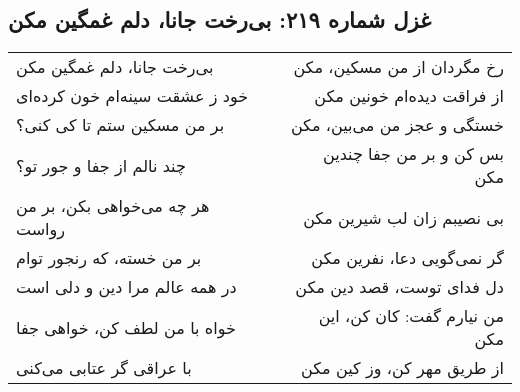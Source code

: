 \begin{center}
\section*{غزل شماره ۲۱۹: بی‌رخت جانا، دلم غمگین مکن}
\label{sec:219}
\begin{longtable}{l p{0.5cm} r}
بی‌رخت جانا، دلم غمگین مکن
&&
رخ مگردان از من مسکین، مکن
\\
خود ز عشقت سینه‌ام خون کرده‌ای
&&
از فراقت دیده‌ام خونین مکن
\\
بر من مسکین ستم تا کی کنی؟
&&
خستگی و عجز من می‌بین، مکن
\\
چند نالم از جفا و جور تو؟
&&
بس کن و بر من جفا چندین مکن
\\
هر چه می‌خواهی بکن، بر من رواست
&&
بی نصیبم زان لب شیرین مکن
\\
بر من خسته، که رنجور توام
&&
گر نمی‌گویی دعا، نفرین مکن
\\
در همه عالم مرا دین و دلی است
&&
دل فدای توست، قصد دین مکن
\\
خواه با من لطف کن، خواهی جفا
&&
من نیارم گفت: کان کن، این مکن
\\
با عراقی گر عتابی می‌کنی
&&
از طریق مهر کن، وز کین مکن
\\
\end{longtable}
\end{center}
